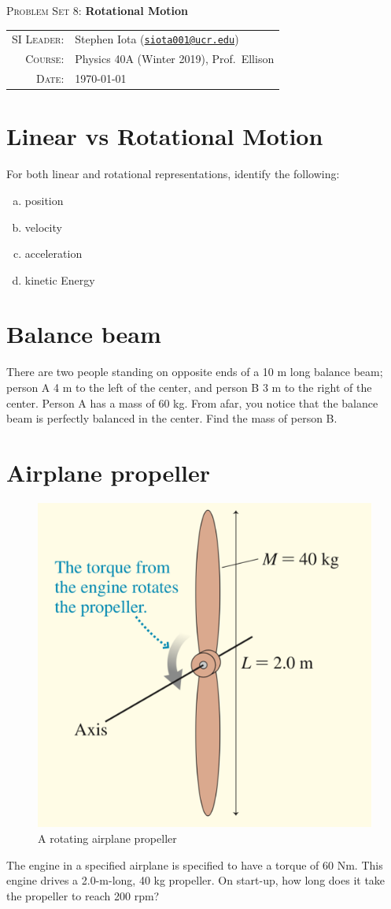 \documentclass[12pt]{article}
\newcommand{\email}[1]{\texttt{\href{mailto:#1}{#1}}}
\begin{document}
\begin{center}

\Large{\textsc{Problem Set 8}: \textbf{Rotational Motion}}
\end{center}
\vspace{.5mm}



\begin{tabular}{rl}
\textsc{SI Leader}:
&
Stephen Iota (\email{siota001@ucr.edu})
\\
\textsc{Course}:
&
Physics 40A (Winter 2019), Prof.~Ellison
\\
\textsc{Date}:
&
\today
\end{tabular}



\section{Linear vs Rotational Motion}


For both linear and rotational representations, identify the following:
\begin{enumerate}[(a)]
	\item position
	\item velocity
	\item acceleration
	\item kinetic Energy
\end{enumerate}


\section{Balance beam}

There are two people standing on opposite ends of a 10 m long balance beam; person A 4 m to the left of the center, and person B 3 m to the right of the center. Person A has a mass of 60 kg. From afar, you notice that the balance beam is perfectly balanced in the center.
Find the mass of person B.


\section{Airplane propeller}

\begin{figure}[b]
\centering
	\includegraphics[width=.3\linewidth]{PS8_fig1}
	\caption{A rotating airplane propeller}
\end{figure}

The engine in a specified airplane is specified to have a torque of 60 Nm. This engine drives a 2.0-m-long, 40 kg propeller. On start-up, how long does it take the propeller to reach 200 rpm?
\end{document}
